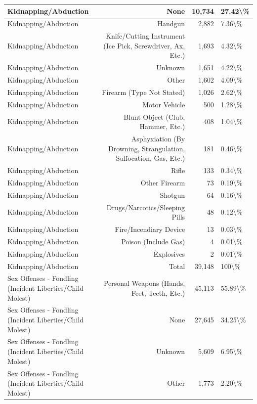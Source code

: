 \documentclass[
]{krantz}
\begin{document}
\begin{longtable}[t]{l|r|r|l}
\hline
Kidnapping/Abduction & None & 10,734 & 27.42\textbackslash{}\%\\
\hline
Kidnapping/Abduction & Handgun & 2,882 & 7.36\textbackslash{}\%\\
\hline
Kidnapping/Abduction & Knife/Cutting Instrument (Ice Pick, Screwdriver, Ax, Etc.) & 1,693 & 4.32\textbackslash{}\%\\
\hline
Kidnapping/Abduction & Unknown & 1,651 & 4.22\textbackslash{}\%\\
\hline
Kidnapping/Abduction & Other & 1,602 & 4.09\textbackslash{}\%\\
\hline
Kidnapping/Abduction & Firearm (Type Not Stated) & 1,026 & 2.62\textbackslash{}\%\\
\hline
Kidnapping/Abduction & Motor Vehicle & 500 & 1.28\textbackslash{}\%\\
\hline
Kidnapping/Abduction & Blunt Object (Club, Hammer, Etc.) & 408 & 1.04\textbackslash{}\%\\
\hline
Kidnapping/Abduction & Asphyxiation (By Drowning, Strangulation, Suffocation, Gas, Etc.) & 181 & 0.46\textbackslash{}\%\\
\hline
Kidnapping/Abduction & Rifle & 133 & 0.34\textbackslash{}\%\\
\hline
Kidnapping/Abduction & Other Firearm & 73 & 0.19\textbackslash{}\%\\
\hline
Kidnapping/Abduction & Shotgun & 64 & 0.16\textbackslash{}\%\\
\hline
Kidnapping/Abduction & Drugs/Narcotics/Sleeping Pills & 48 & 0.12\textbackslash{}\%\\
\hline
Kidnapping/Abduction & Fire/Incendiary Device & 13 & 0.03\textbackslash{}\%\\
\hline
Kidnapping/Abduction & Poison (Include Gas) & 4 & 0.01\textbackslash{}\%\\
\hline
Kidnapping/Abduction & Explosives & 2 & 0.01\textbackslash{}\%\\
\hline
Kidnapping/Abduction & Total & 39,148 & 100\textbackslash{}\%\\
\hline
Sex Offenses - Fondling (Incident Liberties/Child Molest) & Personal Weapons (Hands, Feet, Teeth, Etc.) & 45,113 & 55.89\textbackslash{}\%\\
\hline
Sex Offenses - Fondling (Incident Liberties/Child Molest) & None & 27,645 & 34.25\textbackslash{}\%\\
\hline
Sex Offenses - Fondling (Incident Liberties/Child Molest) & Unknown & 5,609 & 6.95\textbackslash{}\%\\
\hline
Sex Offenses - Fondling (Incident Liberties/Child Molest) & Other & 1,773 & 2.20\textbackslash{}\%\\

\end{longtable}
\end{document}
